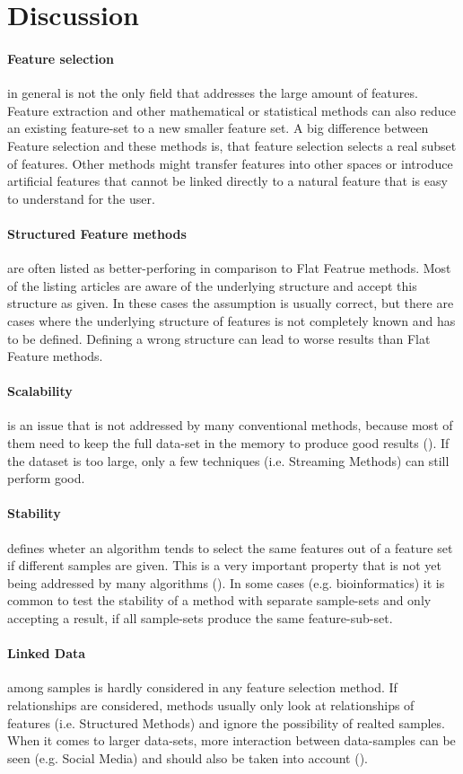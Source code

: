 \section{Discussion}
\label{sec:discussion}

\paragraph{Feature selection} in general is not the only field that addresses
the large amount of features. Feature extraction and other mathematical or
statistical methods can also reduce an existing feature-set to a new smaller
feature set. A big difference between Feature selection and these methods is,
that feature selection selects a real subset of features. Other methods might
transfer features into other spaces or introduce artificial features that cannot
be linked directly to a natural feature that is easy to understand for the user.

\paragraph{Structured Feature methods} are often listed as better-perforing in
comparison to Flat Featrue methods. Most of the listing articles are aware of
the underlying structure and accept this structure as given. In these cases the
assumption is usually correct, but there are cases where the underlying
structure of features is not completely known and has to be defined. Defining a
wrong structure can lead to worse results than Flat Feature methods. 

\paragraph{Scalability} is an issue that is not addressed by many conventional
methods, because most of them need to keep the full data-set in the memory to
produce good results (\cite{Tang:14}). If the dataset is too large, only a few
techniques (i.e. Streaming Methods) can still perform good.

\paragraph{Stability} defines wheter an algorithm tends to select the same
features out of a feature set if different samples are given. This is a very
important property that is not yet being addressed by many algorithms
(\cite{Tang:14}). In some cases (e.g. bioinformatics) it is common to test the
stability of a method with separate sample-sets and only accepting a result, if
all sample-sets produce the same feature-sub-set.

\paragraph{Linked Data} among samples is hardly considered in any feature
selection method. If relationships are considered, methods usually only look at
relationships of features (i.e. Structured Methods) and ignore the possibility
of realted samples. When it comes to larger data-sets, more interaction between
data-samples can be seen (e.g. Social Media) and should also be taken into
account (\cite{Tang:14}).


